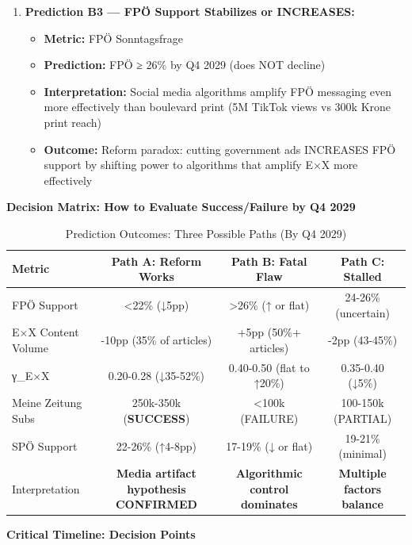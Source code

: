 \begin{enumerate}
\item \textbf{Prediction B3 — FPÖ Support Stabilizes or INCREASES:}
  \begin{itemize}
  \item \textbf{Metric:} FPÖ Sonntagsfrage
  \item \textbf{Prediction:} FPÖ ≥ 26\% by Q4 2029 (does NOT decline)
  \item \textbf{Interpretation:} Social media algorithms amplify FPÖ messaging even more effectively
    than boulevard print (5M TikTok views vs 300k Krone print reach)
  \item \textbf{Outcome:} Reform paradox: cutting government ads INCREASES FPÖ support by shifting
    power to algorithms that amplify E×X more effectively
  \end{itemize}

\end{enumerate}

\textbf{Decision Matrix: How to Evaluate Success/Failure by Q4 2029}

\begin{table}[h]
\centering
\caption{Prediction Outcomes: Three Possible Paths (By Q4 2029)}
\label{tab:dx-predictions-outcomes}
\begin{tabular}{|l|c|c|c|}
\hline
\textbf{Metric} & \textbf{Path A: Reform Works} & \textbf{Path B: Fatal Flaw} & \textbf{Path C: Stalled} \\
\hline
FPÖ Support & <22\% (↓5pp) & >26\% (↑ or flat) & 24-26\% (uncertain) \\
\hline
E×X Content Volume & -10pp (35\% of articles) & +5pp (50\%+ articles) & -2pp (43-45\%) \\
\hline
γ_{E×X} & 0.20-0.28 (↓35-52\%) & 0.40-0.50 (flat to ↑20\%) & 0.35-0.40 (↓5\%) \\
\hline
Meine Zeitung Subs & 250k-350k (\textbf{SUCCESS}) & <100k (FAILURE) & 100-150k (PARTIAL) \\
\hline
SPÖ Support & 22-26\% (↑4-8pp) & 17-19\% (↓ or flat) & 19-21\% (minimal) \\
\hline
Interpretation & \textbf{Media artifact hypothesis CONFIRMED} & \textbf{Algorithmic control dominates} & \textbf{Multiple factors balance} \\
\hline
\end{tabular}
\end{table}

\textbf{Critical Timeline: Decision Points}

